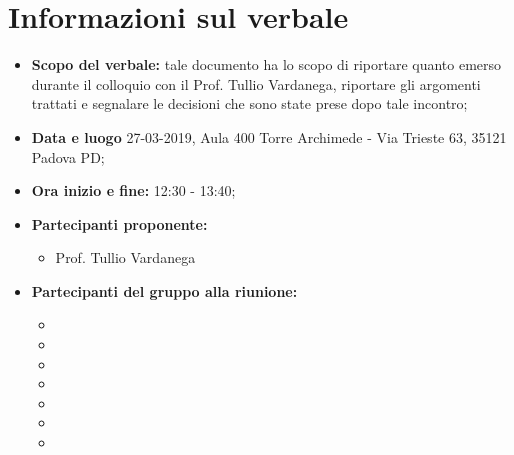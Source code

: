 \clearpage
\section{Informazioni sul verbale}
\begin{itemize}
	\item \textbf {Scopo del verbale:} tale documento ha lo scopo di riportare quanto emerso durante il colloquio con il Prof. Tullio Vardanega, riportare gli argomenti trattati e segnalare le decisioni che sono state prese dopo tale incontro;
	\item \textbf {Data e luogo} 27-03-2019, Aula 400 Torre Archimede - Via Trieste 63, 35121 Padova PD;
	\item \textbf {Ora inizio e fine:} 12:30 - 13:40;
	\item \textbf {Partecipanti proponente:} 
		\begin{itemize}
			\item Prof. Tullio Vardanega
		\end{itemize}
	\item \textbf {Partecipanti del gruppo alla riunione:} 
		 \begin{itemize}
			\item \sonia
			\item \luca
			\item \matteo
			\item \pardeep
			\item \alberto
			\item \alessandro
			\item \andrea
		\end{itemize}
\end{itemize}